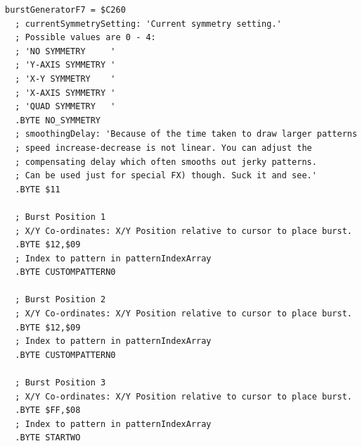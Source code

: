 \begin{lstlisting}[caption=Source code for the F7 Burst.]
burstGeneratorF7 = $C260
  ; currentSymmetrySetting: 'Current symmetry setting.'
  ; Possible values are 0 - 4:
  ; 'NO SYMMETRY     '
  ; 'Y-AXIS SYMMETRY '
  ; 'X-Y SYMMETRY    '
  ; 'X-AXIS SYMMETRY '
  ; 'QUAD SYMMETRY   '
  .BYTE NO_SYMMETRY
  ; smoothingDelay: 'Because of the time taken to draw larger patterns
  ; speed increase-decrease is not linear. You can adjust the 
  ; compensating delay which often smooths out jerky patterns. 
  ; Can be used just for special FX) though. Suck it and see.'
  .BYTE $11

  ; Burst Position 1
  ; X/Y Co-ordinates: X/Y Position relative to cursor to place burst.
  .BYTE $12,$09
  ; Index to pattern in patternIndexArray
  .BYTE CUSTOMPATTERN0

  ; Burst Position 2
  ; X/Y Co-ordinates: X/Y Position relative to cursor to place burst.
  .BYTE $12,$09
  ; Index to pattern in patternIndexArray
  .BYTE CUSTOMPATTERN0

  ; Burst Position 3
  ; X/Y Co-ordinates: X/Y Position relative to cursor to place burst.
  .BYTE $FF,$08
  ; Index to pattern in patternIndexArray
  .BYTE STARTWO

\end{lstlisting}

\clearpage
